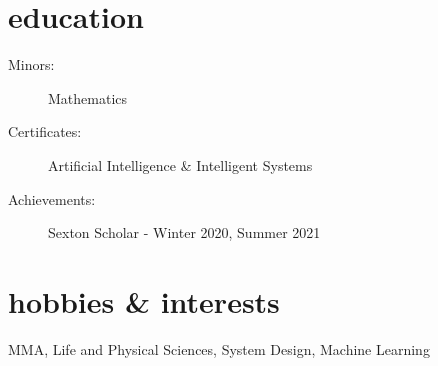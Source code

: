 \documentclass{resume}
\begin{document}
\section*{education}
\begin{description}
  \item[Minors:] Mathematics
  \item[Certificates:] Artificial Intelligence \& Intelligent Systems
  \item[Achievements:] Sexton Scholar - Winter 2020, Summer 2021
\end{description}
\section*{hobbies \& interests}
MMA, Life and Physical Sciences, System Design, Machine Learning
\end{document}
